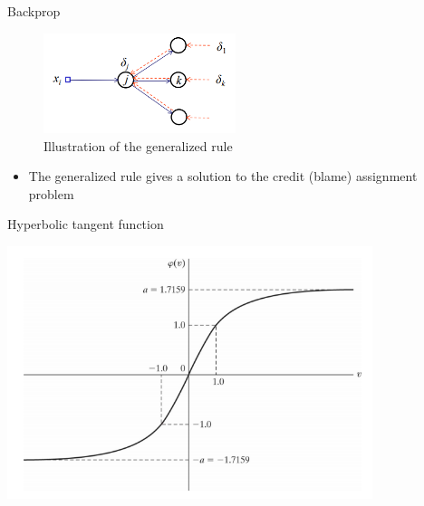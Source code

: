 \documentclass[notes]{beamer}
\providecommand{\tightlist}{%
  \setlength{\itemsep}{0pt}\setlength{\parskip}{0pt}}
\begin{document}
\begin{frame}{Backprop}

\begin{figure}
\centering
\includegraphics[width=0.50000\textwidth]{2018-03-10-15-36-58.png}
\caption{Illustration of the generalized rule}
\end{figure}

\begin{itemize}
\tightlist
\item
  The generalized rule gives a solution to the credit (blame) assignment
  problem
\end{itemize}

\end{frame}

\begin{frame}{Hyperbolic tangent function}

\centering 

\includegraphics[width=0.80000\textwidth]{2018-03-10-15-37-41.png} ~

\end{frame}
\end{document}
